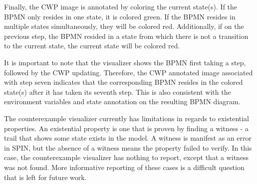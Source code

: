 Finally, the CWP image is annotated by coloring the current state(s). If the BPMN only resides in one state, it is colored green. If the BPMN resides in multiple states simultaneously, they will be colored red. Additionally, if on the previous step, the BPMN resided in a state from which there is not a transition to the current state, the current state will be colored red.

It is important to note that the visualizer shows the BPMN first taking a step, followed by the CWP updating. Therefore, the CWP annotated image associated with step seven indicates that the corresponding BPMN resides in the colored state(s) after it has taken its seventh step. This is also consistent with the environment variables and state annotation on the resulting BPMN diagram.

The counterexample visualizer currently has limitations in regards to existential properties. An existential property is one that is proven by finding a witness - a trail that shows some state exists in the model. A witness is manifest as an error in SPIN, but the absence of a witness means the property failed to verify. In this case, the counterexample visualizer has nothing to report, except that a witness was not found. More informative reporting of these cases is a difficult question that is left for future work.
